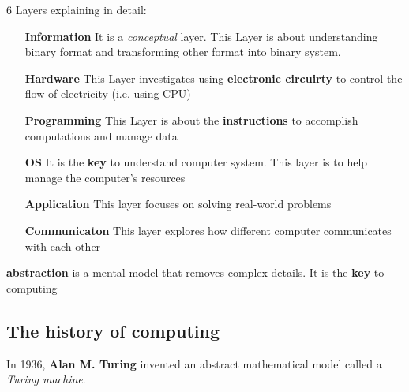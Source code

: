 \documentclass[12pt]{article}
\begin{document}
6 Layers explaining in detail:
\begin{enumerate}
    \item[\textbf{Information}] It is a \textit{conceptual} layer. This Layer is about understanding binary format and transforming other format into binary system.
    \item[\textbf{Hardware}] This Layer investigates using \textbf{electronic circuirty} to control the flow of electricity (i.e. using CPU)
    \item[\textbf{Programming}] This Layer is about the \textbf{instructions} to accomplish computations and manage data
    \item[\textbf{OS}] It is the \textbf{key} to understand computer system. This layer is to help manage the computer's resources
    \item[\textbf{Application}] This layer focuses on solving real-world problems
    \item[\textbf{Communicaton}] This layer explores how different computer communicates with each other   
\end{enumerate}

\textbf{abstraction} is a \underline{mental model} that removes complex details.
It is the \textbf{key} to computing 

\subsection{The history of computing}
In 1936, \textbf{Alan M. Turing} invented an abstract mathematical model called a \textit{Turing machine}.
\end{document}
